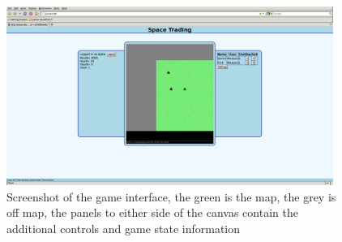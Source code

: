 \documentclass[12pt]{amsart}
\begin{document}
\begin{figure}[h]
\begin{center}
\includegraphics[width = 0.95\textwidth]{screeny}
\caption{Screenshot of the game interface, the green is the map, the grey is off map, the panels to either side of the canvas contain the additional controls and game state information}
\end{center}
\end{figure}
\end{document}

